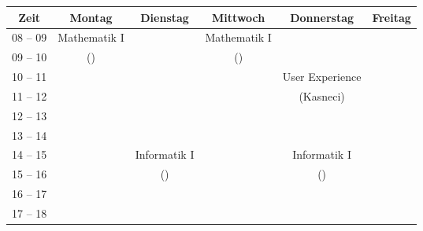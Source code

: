 \begin{minipage}{\textwidth}
    \footnotesize
\begin{center}
	\begin{tabular}{|c|c|c|c|c|c|}
	\hline
	 Zeit     &    Montag                    & Dienstag          & Mittwoch          & Donnerstag & Freitag \\ \hline\hline
	 08 -- 09 &    Mathematik I              &                   & Mathematik I      &  &  \\ \cline{1-1} \cline{3-3} \cline{5-6} 
	 09 -- 10 &    (\Matheprof)         	 &                   & (\Matheprof) &  &  \\ \hline
	 10 -- 11 &                              &                   &                   & User Experience &  \\ \cline{1-4} \cline{6-6} 
	 11 -- 12 &                              &                   &                   & (Kasneci) &  \\ \hline
	 12 -- 13 &                              &                   &                   &  &  \\ \hline
	 13 -- 14 &                              &                   &                   &  &  \\ \hline
	 14 -- 15 &                              & Informatik I  &                   & Informatik I &  \\ \cline{1-2} \cline{4-4}\cline{6-6} 
	 15 -- 16 &                              & (\Infoprof)  &                   & (\Infoprof) &  \\ \hline
	 16 -- 17 &                              &                   &                   &  &  \\ \hline
	 17 -- 18 &                              &                   &                   &  &  \\ \hline 
	\end{tabular}

\end{center}
\end{minipage}

